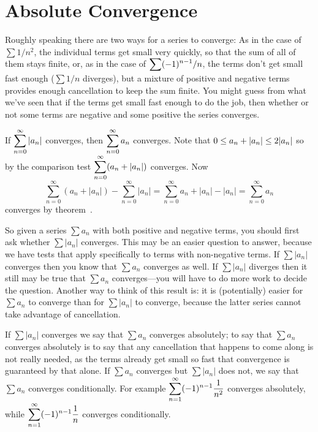 \section{Absolute Convergence}{}{}
\nobreak
Roughly speaking there are two ways for a series to converge: As in
the case of $\sum 1/n^2$, the individual terms get small very quickly,
so that the sum of all of them stays finite, or, as in the case of
$\displaystyle \sum (-1)^{n-1}/n$, the terms don't get small fast enough ($\sum 1/n$
diverges), but a mixture of positive and negative terms provides
enough cancellation to keep the sum finite. You might guess from what
we've seen that if the terms get small fast enough to do the job, then
whether or not some terms are negative and some positive the series
converges. 

\thm If $\displaystyle\sum_{n=0}^\infty |a_n|$ converges, then 
$\displaystyle\sum_{n=0}^\infty a_n$ converges.
\endthm
\proof
Note that $\displaystyle 0\le a_n+|a_n|\le 2|a_n|$ so by the comparison test
$\displaystyle\sum_{n=0}^\infty (a_n+|a_n|)$ converges. Now
$$
  \sum_{n=0}^\infty (a_n+|a_n|) -\sum_{n=0}^\infty |a_n|
  = \sum_{n=0}^\infty a_n+|a_n|-|a_n| = \sum_{n=0}^\infty a_n 
$$
converges by theorem~.
\endproof

So given a series $\sum a_n$ with both positive and negative terms,
you should first ask whether $\sum |a_n|$ converges. This may be an
easier question to answer, because we have tests that apply
specifically to terms with non-negative terms. If $\sum |a_n|$
converges then you know that $\sum a_n$ converges as well. If $\sum
|a_n|$ diverges then it still may be true that $\sum a_n$
converges---you will have to do more work to decide the question.
Another way to think of this result is: it is (potentially) easier for
$\sum a_n$ to converge than for $\sum |a_n|$ to converge, because the
latter series cannot take advantage of cancellation. 

If $\sum |a_n|$ converges we say that $\sum a_n$ converges {\dfont
absolutely\/}; to say that $\sum
a_n$ converges absolutely is to say that any cancellation that happens
to come along is not really needed, as the terms already get small so
fast that convergence is guaranteed by that alone. If $\sum a_n$
converges but $\sum |a_n|$ does not, we say that $\sum a_n$ converges
{\dfont conditionally}. For
example $\displaystyle\sum_{n=1}^\infty (-1)^{n-1} {1\over n^2}$ converges
absolutely, while $\displaystyle\sum_{n=1}^\infty (-1)^{n-1} {1\over n}$
converges conditionally.


